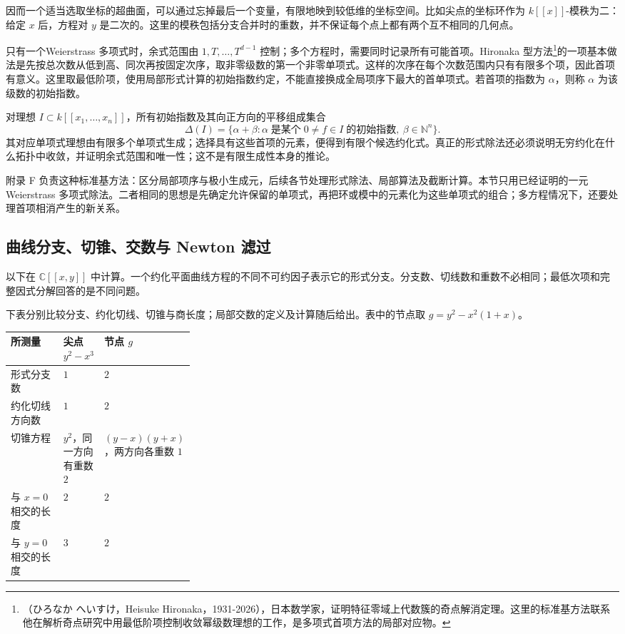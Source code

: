 因而一个适当选取坐标的超曲面，可以通过忘掉最后一个变量，有限地映到较低维的坐标空间。比如尖点的坐标环作为 \(k[\![x]\!]\)-模秩为二：给定 \(x\) 后，方程对 \(y\) 是二次的。这里的模秩包括分支合并时的重数，并不保证每个点上都有两个互不相同的几何点。

\ProseParagraphBreak
只有一个Weierstrass 多项式时，余式范围由 \(1,T,\ldots,T^{d-1}\) 控制；多个方程时，需要同时记录所有可能首项。Hironaka 型方法\footnote{（ひろなか へいすけ，Heisuke Hironaka，1931-2026），日本数学家，证明特征零域上代数簇的奇点解消定理。这里的标准基方法联系他在解析奇点研究中用最低阶项控制收敛幂级数理想的工作，是多项式首项方法的局部对应物。}的一项基本做法是先按总次数从低到高、同次再按固定次序，取非零级数的第一个非零单项式。这样的次序在每个次数范围内只有有限多个项，因此首项有意义。这里取最低阶项，使用局部形式计算的初始指数约定，不能直接换成全局项序下最大的首单项式。若首项的指数为 \(\alpha\)，则称 \(\alpha\) 为该级数的初始指数。

\ProseParagraphBreak
对理想 \(I\subset k[\![x_1,\ldots,x_n]\!]\)，所有初始指数及其向正方向的平移组成集合
\[
	\Delta(I)=\{\alpha+\beta: \alpha\;\text{是某个}\;0\ne f\in I\;\text{的初始指数}, \ \beta\in\mathbb N^n\}.
\]
其对应单项式理想由有限多个单项式生成；选择具有这些首项的元素，便得到有限个候选约化式。真正的形式除法还必须说明无穷约化在什么拓扑中收敛，并证明余式范围和唯一性；这不是有限生成性本身的推论。

\ProseParagraphBreak
附录 F 负责这种标准基方法：区分局部项序与极小生成元，后续各节处理形式除法、局部算法及截断计算。本节只用已经证明的一元Weierstrass 多项式除法。二者相同的思想是先确定允许保留的单项式，再把环或模中的元素化为这些单项式的组合；多方程情况下，还要处理首项相消产生的新关系。

\subsection{曲线分支、切锥、交数与 Newton 滤过}
\label{b3:subsec:D03:03}

以下在 \(\mathbb C[\![x,y]\!]\) 中计算。一个约化平面曲线方程的不同不可约因子表示它的形式分支。分支数、切线数和重数不必相同；最低次项和完整因式分解回答的是不同问题。

下表分别比较分支、约化切线、切锥与商长度；局部交数的定义及计算随后给出。表中的节点取 \(g=y^2-x^2(1+x)\)。
\begin{center}
	\begin{tabularx}{\linewidth}{@{}>{\raggedright\arraybackslash}p{0.30\linewidth}XX@{}}
		\toprule
		所测量 & 尖点 \(y^2-x^3\) & 节点 \(g\) \\
		\midrule
		形式分支数 & \(1\) & \(2\) \\
		约化切线方向数 & \(1\) & \(2\) \\
		切锥方程 & \(y^2\)，同一方向有重数 \(2\) & \((y-x)(y+x)\)，两方向各重数 \(1\) \\
		与 \(x=0\) 相交的长度 & \(2\) & \(2\) \\
		与 \(y=0\) 相交的长度 & \(3\) & \(2\) \\
		\bottomrule
	\end{tabularx}
\end{center}

